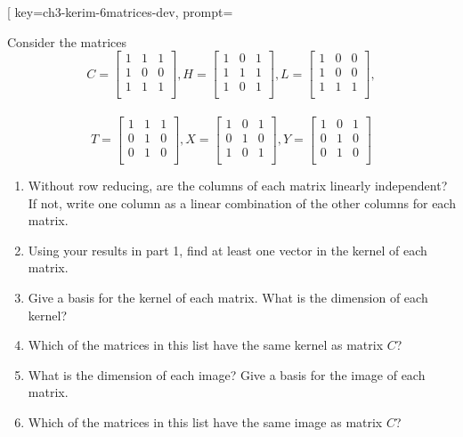 \begin{SaveQuestion}[
        key=ch3-kerim-6matrices-dev,
        prompt={Consider the matrices $$C= \begin{bmatrix} 1&1&1\\1&0&0\\1&1&1\\ \end{bmatrix}, H= \begin{bmatrix} 1&0&1\\1&1&1\\1&0&1\\ \end{bmatrix}, L= \begin{bmatrix} 1&0&0\\1&0&0\\1&1&1\\ \end{bmatrix},$$ \\ $$T= \begin{bmatrix} 1&1&1\\0&1&0\\0&1&0\\ \end{bmatrix}, X= \begin{bmatrix} 1&0&1\\0&1&0\\1&0&1\\ \end{bmatrix}, Y= \begin{bmatrix} 1&0&1\\0&1&0\\0&1&0\\ \end{bmatrix}$$ 
        \begin{enumerate} 
            \item Without row reducing, are the columns of each matrix linearly independent? If not, write one column as a linear combination of the other columns for each matrix.
            \item Using your results in part 1, find at least one vector in the kernel of each matrix.
            \item Give a basis for the kernel of each matrix. What is the dimension of each kernel? 
            \item Which of the matrices in this list have the same kernel as matrix $C$? 
            \item What is the dimension of each image? Give a basis for the image of each matrix. 
            \item Which of the matrices in this list have the same image as matrix $C$?  

\end{enumerate}}
\end{SaveQuestion}
